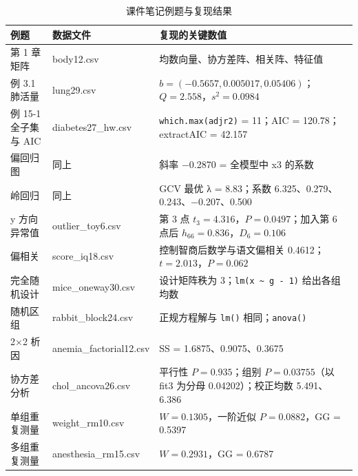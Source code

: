 \begin{table}[htbp]
\centering\small
\caption{课件笔记例题与复现结果}
\begin{tabular}{@{}p{3.2cm}p{3.8cm}p{7.0cm}@{}}
\toprule
例题 & 数据文件 & 复现的关键数值\\
\midrule
第 1 章 矩阵 & body12.csv & 均数向量、协方差阵、相关阵、特征值\\
例 3.1 肺活量 & lung29.csv & $b=(-0.5657, 0.005017, 0.05406)$；$Q=2.558$，$s^2=0.0984$\\
例 15-1 全子集与 AIC & diabetes27\_hw.csv & \Verb|which.max(adjr2)| = 11；AIC = 120.78；extractAIC = 42.157\\
偏回归图 & 同上 & 斜率 −0.2870 = 全模型中 x3 的系数\\
岭回归 & 同上 & GCV 最优 λ = 8.83；系数 6.325、0.279、0.243、−0.207、0.500\\
y 方向异常值 & outlier\_toy6.csv & 第 3 点 $t_3=4.316$，$P=0.0497$；加入第 6 点后 $h_{66}=0.836$，$D_6=0.106$\\
偏相关 & score\_iq18.csv & 控制智商后数学与语文偏相关 0.4612；$t=2.013$，$P=0.062$\\
完全随机设计 & mice\_oneway30.csv & 设计矩阵秩为 3；\Verb|lm(x ~ g - 1)| 给出各组均数\\
随机区组 & rabbit\_block24.csv & 正规方程解与 \Verb|lm()| 相同；\Verb|anova()|\\
2×2 析因 & anemia\_factorial12.csv & SS = 1.6875、0.9075、0.3675\\
协方差分析 & chol\_ancova26.csv & 平行性 $P=0.935$；组别 $P=0.03755$（以 fit3 为分母 0.04202）；校正均数 5.491、6.386\\
单组重复测量 & weight\_rm10.csv & $W=0.1305$，一阶近似 $P=0.0882$，GG = 0.5397\\
多组重复测量 & anesthesia\_rm15.csv & $W=0.2931$，GG = 0.6787\\
\bottomrule
\end{tabular}
\end{table}

